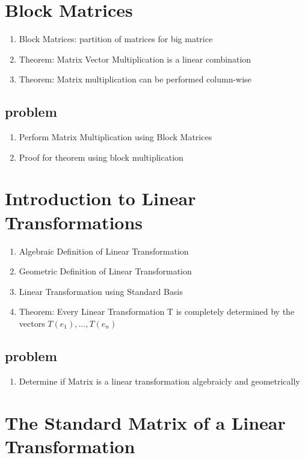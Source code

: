 \documentclass{article}
\begin{document}
\section{Block Matrices}

\begin{enumerate}
    \item Block Matrices: partition of matrices for big matrice
    \item Theorem: Matrix Vector Multiplication is a linear combination
    \item Theorem: Matrix multiplication can be performed column-wise
\end{enumerate}

\subsection{problem}
\begin{enumerate}
    \item Perform Matrix Multiplication using Block Matrices
    \item Proof for theorem using block multiplication
\end{enumerate}

\section{Introduction to Linear Transformations}

\begin{enumerate}
    \item Algebraic Definition of Linear Transformation
    \item Geometric Definition of Linear Transformation
    \item Linear Transformation using Standard Basis
    \item Theorem: Every Linear Transformation T is completely determined
	by the vectors $T(e_1), ..., T(e_n)$
\end{enumerate}

\subsection{problem}
\begin{enumerate}
    \item Determine if Matrix is a linear transformation algebraicly and
	geometrically
\end{enumerate}

\section{The Standard Matrix of a Linear Transformation}
\end{document}
